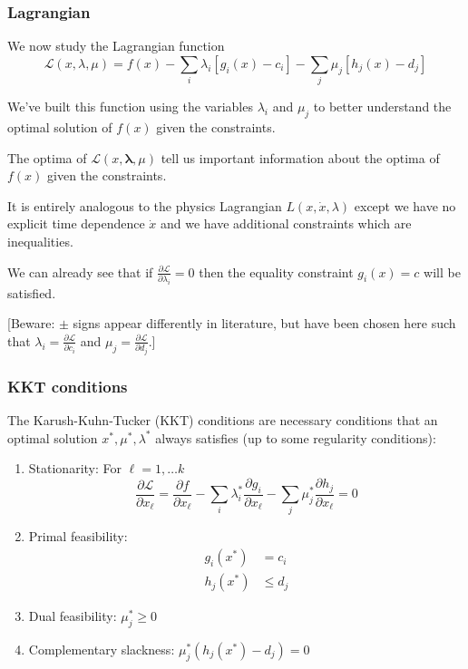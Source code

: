 \documentclass[10pt,aspectratio=169,dvipsnames]{beamer}
\def\l{\lambda}
\def\m{\mu}
\def\d{\partial}
\def\cL{\mathcal{L}}
\let\olditem\item
\renewcommand{\item}{%
\olditem\vspace{5pt}}
\begin{document}
\begin{frame}
  \frametitle{Lagrangian}


We now study the \alert{Lagrangian function}
\begin{equation*}
   \cL(x,\l,\m) = f(x) - \sum_i \l_i \left[g_i(x) - c_i\right]  - \sum_j \m_j \left[h_j(x) - d_j\right]
\end{equation*}

We've built this function using the variables $\l_i$ and $\m_j$ to
better understand the optimal solution of $f(x)$ given the
constraints.

The optima of $\cL(x,\mathbf{\l},\m)$ tell us important information
about the optima of $f(x)$ given the constraints.

It is entirely analogous to the physics Lagrangian $L(x,\dot{x},\l)$
except we have no explicit time dependence $\dot{x}$ and  we have additional
constraints which are inequalities.

We can already see that if $\frac{\d \cL}{\d \l_i} = 0$ then the
equality constraint $g_i(x) = c$ will be satisfied.

[Beware: $\pm$ signs appear differently in literature, but have been chosen here such that $\l_i = \frac{\d \cL}{\d c_i}$ and $\m_j
  = \frac{\d \cL}{\d d_j}$.]


\end{frame}



\begin{frame}
  \frametitle{KKT conditions}

The \alert{Karush-Kuhn-Tucker (KKT) conditions} are necessary conditions that an optimal solution $x^*,\m^*,\l^*$ always satisfies (up to some regularity conditions):
\begin{enumerate}
\item \alert{Stationarity}: For $\ell = 1,\dots k$
  \begin{equation*}
  \frac{\d \cL}{\d x_\ell} =   \frac{\d f}{\d x_\ell} - \sum_i \l_i^* \frac{\d g_i}{\d x_\ell}  - \sum_j \m_j^* \frac{\d h_j}{\d x_\ell} = 0
  \end{equation*}
    \item \alert{Primal feasibility}:
      \begin{align*}
        g_i(x^*) & = c_i \\
        h_j(x^*) &\leq d_j
      \end{align*}
    \item \alert{Dual feasibility}: $\m_j^* \geq 0$
    \item \alert{Complementary slackness}: $\m_j^* (h_j(x^*) - d_j) = 0$
\end{enumerate}

\end{frame}
\end{document}
